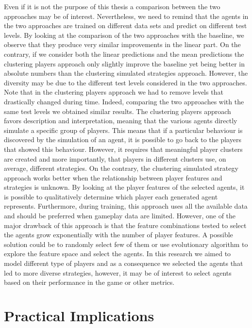 Even if it is not the purpose of this thesis a comparison between the two approaches may be of interest. Nevertheless, we need to remind that the agents in the two approaches are trained on different data sets and predict on different test levels.
By looking at the comparison of the two approaches with the baseline, we observe that they produce very similar improvements in the linear part. On the contrary, if we consider both the linear predictions and the mean predictions the clustering players approach only slightly improve the baseline yet being better in absolute numbers than the clustering simulated strategies approach. However, the diversity may be due to the different test levels considered in the two approaches. Note that in the clustering players approach we had to remove levels that drastically changed during time. Indeed, comparing the two approaches with the same test levels we obtained similar results.
The clustering players approach favors description and interpretation, meaning that the various agents directly simulate a specific group of players. This means that if a particular behaviour is discovered by the simulation of an agent, it is possible to go back to the players that showed this behaviour. However, it requires that meaningful player clusters are created and more importantly, that players in different clusters use, on average, different strategies. On the contrary, the clustering simulated strategy approach works better when the relationship between player features and strategies is unknown. By looking at the player features of the selected agents, it is possible to qualitatively determine which player each generated agent represents. Furthermore, during training, this approach uses all the available data and should be preferred when gameplay data are limited. However, one of the major drawback of this approach is that the feature combinations tested to select the agents grow exponentially with the number of player features. A possible solution could be to randomly select few of them or use evolutionary algorithm to explore the feature space and select the agents. In this research we aimed to model different type of players and as a consequence we selected the agents that led to more diverse strategies, however, it may be of interest to select agents based on their performance in the game or other metrics.


\section{Practical Implications}

